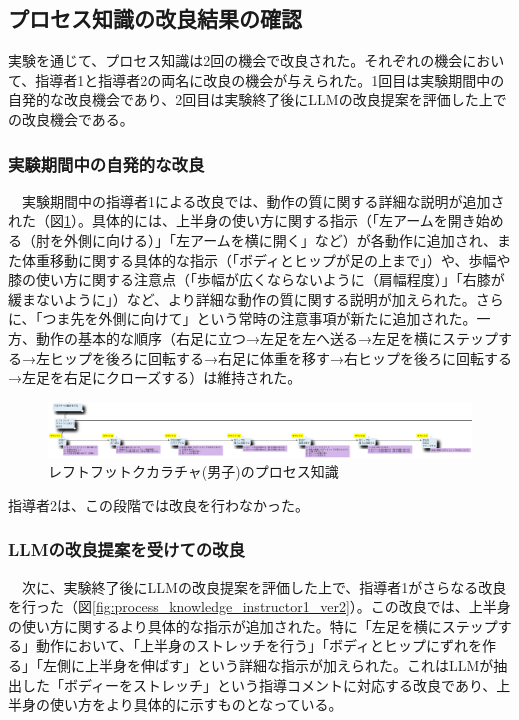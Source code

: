 \subsection{プロセス知識の改良結果の確認}
実験を通じて、プロセス知識は2回の機会で改良された。それぞれの機会において、指導者1と指導者2の両名に改良の機会が与えられた。1回目は実験期間中の自発的な改良機会であり、2回目は実験終了後にLLMの改良提案を評価した上での改良機会である。\\

\subsubsection{実験期間中の自発的な改良}
　実験期間中の指導者1による改良では、動作の質に関する詳細な説明が追加された（図\ref{fig:process_knowledge_instructor1_ver1}）。具体的には、上半身の使い方に関する指示（「左アームを開き始める（肘を外側に向ける）」「左アームを横に開く」など）が各動作に追加され、また体重移動に関する具体的な指示（「ボディとヒップが足の上まで」）や、歩幅や膝の使い方に関する注意点（「歩幅が広くならないように（肩幅程度）」「右膝が緩まないように」）など、より詳細な動作の質に関する説明が加えられた。さらに、「つま先を外側に向けて」という常時の注意事項が新たに追加された。一方、動作の基本的な順序（右足に立つ→左足を左へ送る→左足を横にステップする→左ヒップを後ろに回転する→右足に体重を移す→右ヒップを後ろに回転する→左足を右足にクローズする）は維持された。

\begin{figure}[htbp]
    \centering
    \includegraphics[width=1.0\linewidth]{./image/process_knowledge_instructor1_ver1.png}
    \caption{レフトフットクカラチャ(男子)のプロセス知識}
    \label{fig:process_knowledge_instructor1_ver1}
\end{figure}

指導者2は、この段階では改良を行わなかった。

\subsubsection{LLMの改良提案を受けての改良}
　次に、実験終了後にLLMの改良提案を評価した上で、指導者1がさらなる改良を行った（図\ref{fig:process_knowledge_instructor1_ver2}）。この改良では、上半身の使い方に関するより具体的な指示が追加された。特に「左足を横にステップする」動作において、「上半身のストレッチを行う」「ボディとヒップにずれを作る」「左側に上半身を伸ばす」という詳細な指示が加えられた。これはLLMが抽出した「ボディーをストレッチ」という指導コメントに対応する改良であり、上半身の使い方をより具体的に示すものとなっている。\\

